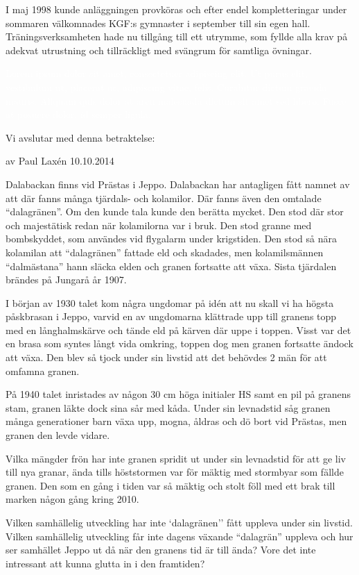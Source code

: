 I maj 1998 kunde anläggningen provköras och efter endel kompletteringar under sommaren välkomnades KGF:s gymnaster i september till sin egen hall. Träningsverksamheten hade nu tillgång till ett utrymme, som fyllde alla krav på adekvat utrustning och tillräckligt med svängrum för samtliga övningar.


\textcolor{white}{Lorem ipsum dolor sit amet, consectetuer adipiscing elit. Ut purus elit, vestibulum ut, placerat ac, adipiscing vitae, felis. Curabitur dictum gravida mauris. Aliquam quis dolor at arcu malesuada dictum sit amet sed libero. Fusce at posuere dolor, id semper ligula.} %


Vi avslutar med denna betraktelse:

%

av Paul Laxén 10.10.2014

Dalabackan finns vid Prästas i Jeppo. Dalabackan har antagligen fått namnet av att där fanns många tjärdals- och kolamilor. Där fanns även den omtalade ``dalagränen''. Om den kunde tala kunde den berätta mycket. Den stod där stor och majestätisk redan när kolamilorna var i bruk. Den stod granne med bombskyddet, som användes vid flygalarm under krigstiden. Den stod så nära kolamilan att ``dalagränen'' fattade eld och skadades, men kolamilsmännen ``dalmästana'' hann släcka elden och granen fortsatte att växa. Sista tjärdalen brändes på Jungarå år 1907.

I början av 1930 talet kom några ungdomar på idén att nu skall vi ha högsta påskbrasan i Jeppo, varvid en av ungdomarna klättrade upp till granens topp med en långhalmskärve och tände eld på kärven där uppe i toppen. Visst var det en brasa som syntes långt vida omkring, toppen dog men granen fortsatte ändock att växa. Den blev så tjock under sin livstid att det behövdes 2 män för att omfamna granen.

På 1940 talet inristades av någon 30 cm höga initialer HS samt en pil på granens stam, granen läkte dock sina sår med kåda. Under sin levnadstid såg granen många generationer barn växa upp, mogna, åldras och dö bort vid Prästas, men granen den levde vidare.

Vilka mängder frön har inte granen spridit ut under sin levnadstid för att ge liv till nya granar, ända tills höststormen var för mäktig med stormbyar som fällde granen. Den som en gång i tiden var så mäktig och stolt föll med ett brak till marken någon gång kring 2010.

Vilken samhällelig utveckling har inte `dalagränen'' fått uppleva under sin livstid. Vilken samhällelig utveckling får inte dagens växande ``dalagrän'' uppleva och hur ser samhället Jeppo ut då när den granens tid är till ända? Vore det inte intressant att kunna glutta in i den framtiden?
